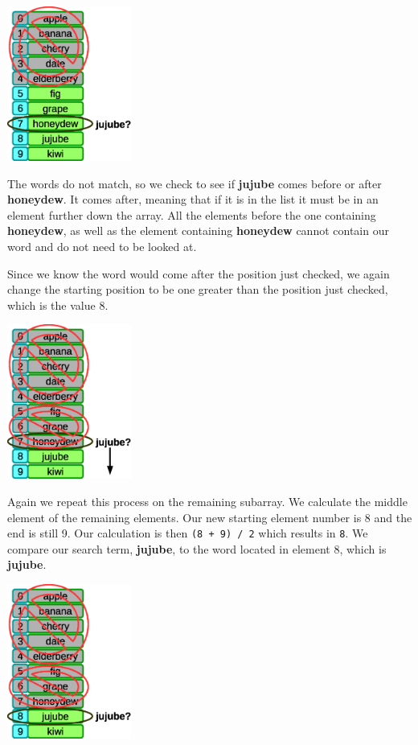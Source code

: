 \beforefig
\centerline{\includegraphics[height=2in]{figs2/recursion-binsearch-success-3.eps}}
\afterfig

The words do not match, so we check to see if \textbf{jujube} comes before or after \textbf{honeydew}. It comes after, meaning that if it is in the list it must be in an element further down the array. All the elements before the one containing \textbf{honeydew}, as well as the element containing \textbf{honeydew} cannot contain our word and do not need to be looked at.

Since we know the word would come after the position just checked, we again change the starting position to be one greater than the position just checked, which is the value  8.

\beforefig
\centerline{\includegraphics[height=2in]{figs2/recursion-binsearch-success-4.eps}}
\afterfig

Again we repeat this process on the remaining subarray. We calculate the middle element of the remaining elements. Our new starting element number is 8 and the end is still 9. Our calculation is then \texttt{(8 + 9) / 2} which results in \texttt{8}. We compare our search term, \textbf{jujube}, to the word located in element 8, which is \textbf{jujube}.

\beforefig
\centerline{\includegraphics[height=2in]{figs2/recursion-binsearch-success-5.eps}}
\afterfig

